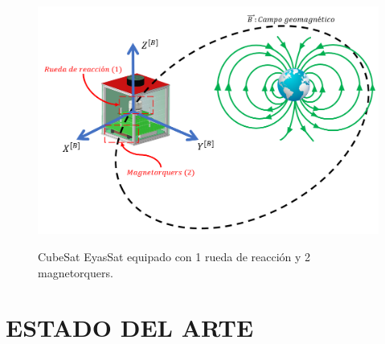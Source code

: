 \begin{figure}[!ht]
	\begin{center}
		\includegraphics[scale=0.5]{imagenes/planteamiento_del_problema/esquema_planteamiento.PNG}\\
	\end{center}
	\caption{CubeSat EyasSat equipado con 1 rueda de reacción y 2 magnetorquers.}
	\label{fig:diagrama_problema}
\end{figure}

\section{ESTADO DEL ARTE}

